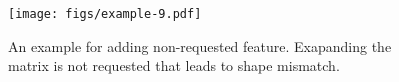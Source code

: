 \begin{figure}
    \centering
    \texttt{[image: figs/example-9.pdf]}
    \vspace{-7pt}
    \caption{An example for adding non-requested feature. Exapanding the matrix is not requested that leads to shape mismatch.}
    \label{fig:example9}
    \vspace{-10pt}
\end{figure}